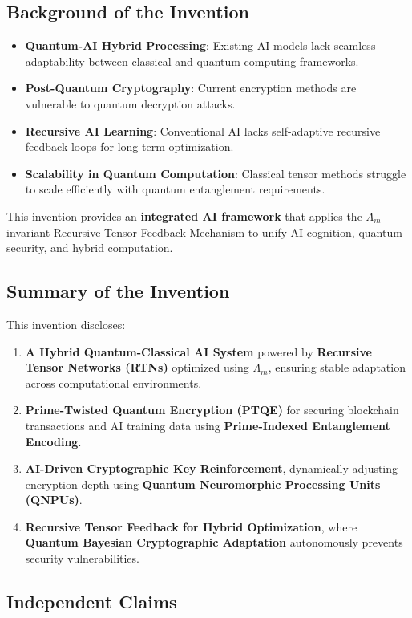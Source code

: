 \documentclass{article}
\theoremstyle{plain}
\begin{document}
\subsection{Background of the Invention}
\begin{itemize}
\item \textbf{Quantum-AI Hybrid Processing}: Existing AI models lack seamless adaptability between classical and quantum computing frameworks.
\item \textbf{Post-Quantum Cryptography}: Current encryption methods are vulnerable to quantum decryption attacks.
\item \textbf{Recursive AI Learning}: Conventional AI lacks self-adaptive recursive feedback loops for long-term optimization.
\item \textbf{Scalability in Quantum Computation}: Classical tensor methods struggle to scale efficiently with quantum entanglement requirements.
\end{itemize}

This invention provides an \textbf{integrated AI framework} that applies the $\Lambda_m$-invariant Recursive Tensor Feedback Mechanism to unify AI cognition, quantum security, and hybrid computation.

\subsection{Summary of the Invention}
This invention discloses:
\begin{enumerate}
\item \textbf{A Hybrid Quantum-Classical AI System} powered by \textbf{Recursive Tensor Networks (RTNs)} optimized using \textbf{$\Lambda_m$}, ensuring stable adaptation across computational environments.
\item \textbf{Prime-Twisted Quantum Encryption (PTQE)} for securing blockchain transactions and AI training data using \textbf{Prime-Indexed Entanglement Encoding}.
\item \textbf{AI-Driven Cryptographic Key Reinforcement}, dynamically adjusting encryption depth using \textbf{Quantum Neuromorphic Processing Units (QNPUs)}.
\item \textbf{Recursive Tensor Feedback for Hybrid Optimization}, where \textbf{Quantum Bayesian Cryptographic Adaptation} autonomously prevents security vulnerabilities.
\end{enumerate}


\subsection{Independent Claims}
\end{document}
